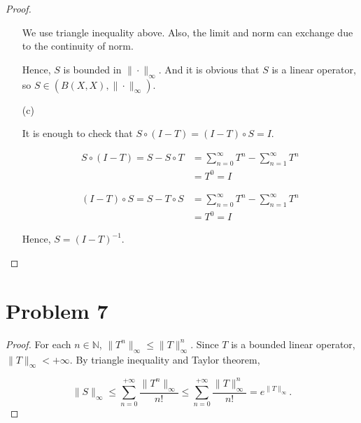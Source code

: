 \documentclass[12pt]{article}
\begin{document}
\begin{proof}
\begin{enumerate}
We use triangle inequality above. Also, the limit and norm can exchange due to the continuity of norm. 

Hence, $S$ is bounded in $\|\cdot\|_\infty$. And it is obvious that $S$ is a linear operator, so $S\in (B(X, X), \|\cdot\|_\infty)$.

\item [(c)]

It is enough to check that $S\circ (I-T) = (I-T)\circ S = I$.

$$
\begin{aligned}
S\circ(I-T) = S - S\circ T & = \sum_{n=0}^\infty T^n - \sum_{n=1}^\infty T^n \\
& = T^0 = I
\end{aligned}
$$

$$
\begin{aligned}
(I-T)\circ S =  S- T\circ S  & = \sum_{n=0}^\infty T^n - \sum_{n=1}^\infty T^n \\
& = T^0 = I
\end{aligned}
$$

Hence, $S = (I -T)^{-1}$.

\end{enumerate}
\end{proof}

\section*{Problem 7}

\begin{proof}

For each $n\in\mathbb N$, $\|T^n\|_\infty \leqslant \|T\|^n_\infty$. Since $T$ is a bounded linear operator, $\|T\|_\infty < +\infty$. By triangle inequality and Taylor theorem, 

$$
\|S\|_\infty \leqslant \sum_{n=0}^{+\infty}\frac{\|T^n\|_\infty}{n!} \leqslant \sum_{n=0}^{+\infty}\frac{\|T\|^n_\infty}{n!} = e^{\| T\|_\infty}.
$$

\end{proof}
\end{document}
